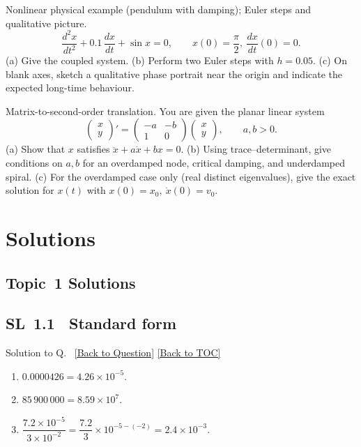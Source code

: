 \documentclass[11pt]{article}
\def\textbf#1{#1}%
\newcommand{\tocsection}[1]{\section{#1}}
\newcommand{\tocsubsection}[1]{\subsection{#1}}
\newcounter{question}
\newcounter{solutionNo} %
\newenvironment{solution}{
  \refstepcounter{solutionNo}%
  \hypertarget{sol-\thesolutionNo}{}%
  \par\noindent\textbf{Solution to Q\thesolutionNo.}~%
  \hyperlink{q-\thesolutionNo}{\small[Back to Question]}%
  \quad\hyperlink{toc}{\small[Back to TOC]}%
  \par\vspace{0.3em}%
}{\par}
\newcommand{\DisableQuestionHeader}{%
  \fancyhead{}%
}
\begin{document}
\begin{question}
\textbf{Nonlinear physical example (pendulum with damping); Euler steps and qualitative picture.}
\[
\frac{d^{2}x}{dt^{2}}+0.1\,\frac{dx}{dt}+\sin x=0,\qquad x(0)=\frac{\pi}{2},\ \frac{dx}{dt}(0)=0.
\]
(a) Give the coupled system.  
(b) Perform two Euler steps with \(h=0.05\).  
(c) On blank axes, sketch a qualitative phase portrait near the origin and indicate the expected long-time behaviour.
\begin{center}
\end{center}
\end{question}

\begin{question}
\textbf{Matrix-to-second-order translation.}
You are given the planar linear system
\[
\begin{pmatrix}x\\y\end{pmatrix}'=
\begin{pmatrix}-a&-b\\1&0\end{pmatrix}
\begin{pmatrix}x\\y\end{pmatrix},\qquad a,b>0.
\]
(a) Show that \(x\) satisfies \(\ddot x + a\dot x + b x=0\).  
(b) Using trace–determinant, give conditions on \(a,b\) for an overdamped node, critical damping, and underdamped spiral.  
(c) For the overdamped case only (real distinct eigenvalues), give the exact solution for \(x(t)\) with \(x(0)=x_0,\ \dot x(0)=v_0\).
\end{question}







\DisableQuestionHeader  %
\tocsection{Solutions}


\tocsubsection{Topic 1 Solutions}
\tocsubsection{SL 1.1 \; Standard form}
\begin{solution}
\begin{enumerate}[label=(\alph*)]
\item \(0.0000426 = 4.26\times 10^{-5}\).
\item \(85\,900\,000 = 8.59\times 10^{7}\).
\item \(\dfrac{7.2\times10^{-5}}{3\times10^{-2}} = \dfrac{7.2}{3}\times 10^{-5-(-2)} = 2.4\times 10^{-3}\).
\end{enumerate}
\end{solution}
\end{document}
